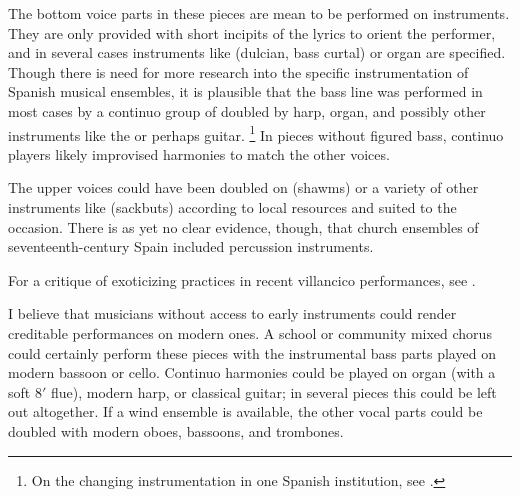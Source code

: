 The bottom voice parts in these pieces are mean to be performed on instruments. 
They are only provided with short incipits of the lyrics to orient the 
performer, and in several cases instruments like  (dulcian, bass 
curtal) or organ are specified.
Though there is need for more research into the specific instrumentation of 
Spanish musical ensembles, it is plausible that the bass line was performed in 
most cases by a continuo group of  doubled by harp, organ, and 
possibly other instruments like the  or perhaps guitar.%
  \footnote{On the changing instrumentation in one Spanish institution, see 
\autocite{Torrente:PhD}.}
In pieces without figured bass, continuo players likely improvised harmonies to 
match the other voices.

The upper voices could have been doubled on  (shawms) or a 
variety of other instruments like  (sackbuts) according to 
local resources and suited to the occasion.
There is as yet no clear evidence, though, that church ensembles of 
seventeenth-century Spain included percussion instruments.%
  \begin{Footnote}
      For a critique of exoticizing practices in recent villancico performances,  
      see \autocite{Baker:PerformancePostColonial}.
  \end{Footnote}

I believe that musicians without access to early instruments could render 
creditable performances on modern ones.
A school or community mixed chorus could certainly perform these pieces with 
the instrumental bass parts played on modern bassoon or cello.
Continuo harmonies could be played on organ (with a soft 8$'$ flue), modern 
harp, or classical guitar; in several pieces this could be left out altogether.
If a wind ensemble is available, the other vocal parts could be doubled with 
modern oboes, bassoons, and trombones.


